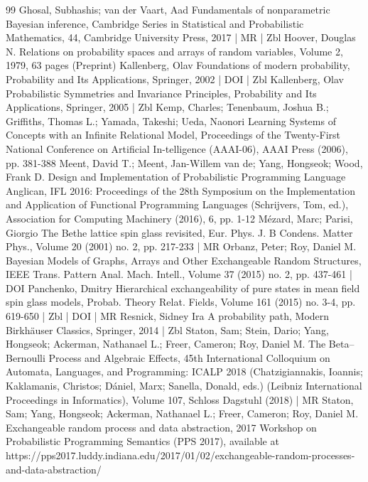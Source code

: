 \documentclass[10pt]{amsart}
\theoremstyle{definition}\newtheorem{defi}[theo]{Definition}\newtheorem{rema}[theo]{Remark}\newtheorem{exam}[theo]{Example}\newtheorem{exem}[theo]{Example}\newtheorem{nota}[theo]{Notation}
\begin{document}
\begin{thebibliography}{99}
Ghosal, Subhashis; van der Vaart, Aad Fundamentals of nonparametric Bayesian inference, Cambridge Series in Statistical and Probabilistic Mathematics, 44, Cambridge University Press, 2017 | MR | Zbl
Hoover, Douglas N. Relations on probability spaces and arrays of random variables, Volume 2, 1979, 63 pages (Preprint)
Kallenberg, Olav Foundations of modern probability, Probability and Its Applications, Springer, 2002 | DOI | Zbl
Kallenberg, Olav Probabilistic Symmetries and Invariance Principles, Probability and Its Applications, Springer, 2005 | Zbl
Kemp, Charles; Tenenbaum, Joshua B.; Griffiths, Thomas L.; Yamada, Takeshi; Ueda, Naonori Learning Systems of Concepts with an Infinite Relational Model, Proceedings of the Twenty-First National Conference on Artificial In-telligence (AAAI-06), AAAI Press (2006), pp. 381-388
Meent, David T.; Meent, Jan-Willem van de; Yang, Hongseok; Wood, Frank D. Design and Implementation of Probabilistic Programming Language Anglican, IFL 2016: Proceedings of the 28th Symposium on the Implementation and Application of Functional Programming Languages (Schrijvers, Tom, ed.), Association for Computing Machinery (2016), 6, pp. 1-12
Mézard, Marc; Parisi, Giorgio The Bethe lattice spin glass revisited, Eur. Phys. J. B Condens. Matter Phys., Volume 20 (2001) no. 2, pp. 217-233 | MR
Orbanz, Peter; Roy, Daniel M. Bayesian Models of Graphs, Arrays and Other Exchangeable Random Structures, IEEE Trans. Pattern Anal. Mach. Intell., Volume 37 (2015) no. 2, pp. 437-461 | DOI
Panchenko, Dmitry Hierarchical exchangeability of pure states in mean field spin glass models, Probab. Theory Relat. Fields, Volume 161 (2015) no. 3-4, pp. 619-650 | Zbl | DOI | MR
Resnick, Sidney Ira A probability path, Modern Birkhäuser Classics, Springer, 2014 | Zbl
Staton, Sam; Stein, Dario; Yang, Hongseok; Ackerman, Nathanael L.; Freer, Cameron; Roy, Daniel M. The Beta–Bernoulli Process and Algebraic Effects, 45th International Colloquium on Automata, Languages, and Programming: ICALP 2018 (Chatzigiannakis, Ioannis; Kaklamanis, Christos; Dániel, Marx; Sanella, Donald, eds.) (Leibniz International Proceedings in Informatics), Volume 107, Schloss Dagstuhl (2018) | MR
Staton, Sam; Yang, Hongseok; Ackerman, Nathanael L.; Freer, Cameron; Roy, Daniel M. Exchangeable random process and data abstraction, 2017 Workshop on Probabilistic Programming Semantics (PPS 2017), available at https://pps2017.luddy.indiana.edu/2017/01/02/exchangeable-random-processes-and-data-abstraction/

\end{thebibliography}
\end{document}
